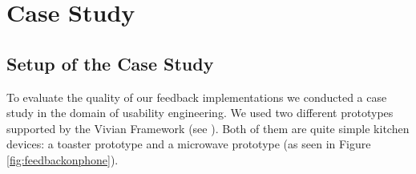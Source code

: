 \documentclass[11pt, a4paper]{article}
\begin{document}
	\section*{Case Study}\label{sec:casestudy}
		\subsection*{Setup of the Case Study}\label{ssec:setup}
			To evaluate the quality of our feedback implementations we conducted a case study in the domain of usability engineering. We used two different prototypes supported by the Vivian Framework (see ). Both of them are quite simple kitchen devices: a toaster prototype and a microwave prototype (as seen in Figure \ref{fig:feedbackonphone}).
\end{document}

